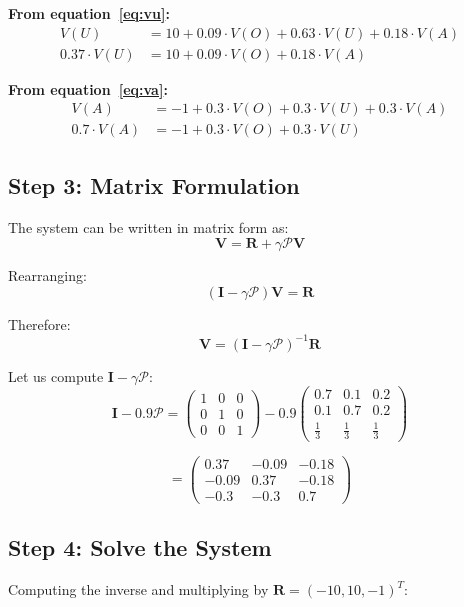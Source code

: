 \documentclass[11pt]{article}
\theoremstyle{definition}
\begin{document}
\textbf{From equation~\eqref{eq:vu}:}
\begin{align*}
V(U) &= 10 + 0.09 \cdot V(O) + 0.63 \cdot V(U) + 0.18 \cdot V(A) \\
0.37 \cdot V(U) &= 10 + 0.09 \cdot V(O) + 0.18 \cdot V(A)
\end{align*}

\textbf{From equation~\eqref{eq:va}:}
\begin{align*}
V(A) &= -1 + 0.3 \cdot V(O) + 0.3 \cdot V(U) + 0.3 \cdot V(A) \\
0.7 \cdot V(A) &= -1 + 0.3 \cdot V(O) + 0.3 \cdot V(U)
\end{align*}

\subsection{Step 3: Matrix Formulation}

The system can be written in matrix form as:
\[
\mathbf{V} = \mathbf{R} + \gamma \mathcal{P} \mathbf{V}
\]

Rearranging:
\[
(\mathbf{I} - \gamma \mathcal{P}) \mathbf{V} = \mathbf{R}
\]

Therefore:
\[
\boxed{\mathbf{V} = (\mathbf{I} - \gamma \mathcal{P})^{-1} \mathbf{R}}
\]

Let us compute $\mathbf{I} - \gamma \mathcal{P}$:
\[
\mathbf{I} - 0.9 \mathcal{P} =
\begin{pmatrix} 1 & 0 & 0 \\ 0 & 1 & 0 \\ 0 & 0 & 1 \end{pmatrix}
- 0.9 \begin{pmatrix} 0.7 & 0.1 & 0.2 \\ 0.1 & 0.7 & 0.2 \\ \frac{1}{3} & \frac{1}{3} & \frac{1}{3} \end{pmatrix}
\]

\[
= \begin{pmatrix}
0.37 & -0.09 & -0.18 \\
-0.09 & 0.37 & -0.18 \\
-0.3 & -0.3 & 0.7
\end{pmatrix}
\]

\subsection{Step 4: Solve the System}

Computing the inverse and multiplying by $\mathbf{R} = (-10, 10, -1)^T$:
\end{document}
